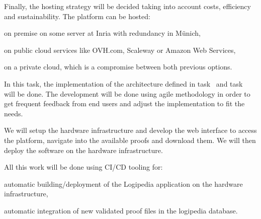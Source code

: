 \begin{workpackage}[id=access,wphases=0-48,type=MGT,
  short=Access,%
  title={Access to the infrastructure},
  lead=Irt,IrtRM=23,OcaRM=6,EduRM=12,InrRM=18]
\begin{tasklist}
\begin{task}[id=infra,
      title=Defining the hardware architecture for the infrastructure,
      lead=Irt,IrtRM=1]
    Finally, the hosting strategy will be decided taking into account
    costs, efficiency and sustainability.  The platform can be hosted:
    \begin{compactitem}
    \item on premise on some server at Inria with redundancy in Münich,
    \item on public cloud services like OVH.com, Scaleway or Amazon
      Web Services,
    \item on a private cloud, which is a compromise between both
      previous options.
    \end{compactitem}
  \end{task}

  \begin{task}[id=web,
      title=Giving access to the infrastructure on the world-wide web,
      lead=Irt,IrtRM=18]
    In this task, the implementation of the architecture defined in
    task~ and task~ will
    be done. The development will be done using agile methodology in
    order to get frequent feedback from end users and adjust the
    implementation to fit the needs.

    We will setup the hardware infrastructure and develop the web
    interface to access the platform, navigate into the available
    proofs and download them.  We will then deploy the software on the
    hardware infrastructure.

    All this work will be done using CI/CD tooling for:
    \begin{compactitem}
    \item automatic building/deployment of the Logipedia application
      on the hardware infrastructure,
    \item automatic integration of new validated proof files in the
      logipedia database.
    \end{compactitem}


\end{task}
\end{tasklist}
\end{workpackage}
